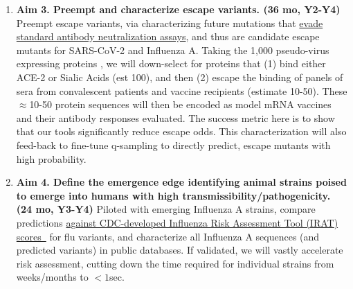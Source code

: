 \documentclass[onecolumn, compsoc,12pt]{IEEEtran}
\def\hcov{SARS-CoV-2\xspace}
\def\infl{Influenza A\xspace}
\begin{document}
\begin{enumerate}
\item \textbf{Aim 3. Preempt and characterize escape variants. (36 mo, Y2-Y4) } Preempt escape variants, via characterizing future mutations that  \uline{evade standard antibody neutralization assays}, and thus are candidate escape mutants for  \hcov and \infl. Taking the 1,000 pseudo-virus expressing proteins , we will down-select for proteins that (1) bind either ACE-2 or Sialic Acids (est 100), and then (2) escape the binding of panels of sera from convalescent patients and vaccine recipients (estimate 10-50). These $\approx$10-50 protein sequences will then be encoded as model mRNA vaccines and their antibody responses evaluated. The success metric here is to show that our tools significantly reduce escape odds. This characterization will also feed-back to fine-tune q-sampling to directly predict, escape mutants with high probability.
\item \textbf{Aim 4. Define the emergence edge identifying animal strains  poised to emerge into humans with high transmissibility/pathogenicity. (24 mo, Y3-Y4)}  Piloted with emerging \infl strains, compare  predictions \uline{against CDC-developed Influenza Risk Assessment Tool (IRAT) scores~\cite{Influenz24:online}}  for flu variants, and  characterize all Influenza A sequences (and predicted variants)  in public databases.  If validated, we will vastly accelerate risk assessment, cutting down the time required for individual strains from weeks/months to $< 1$sec.
\end{enumerate}
%
\end{document}
